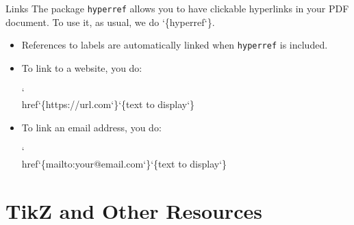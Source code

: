 \documentclass{beamer}
\begin{document}
    \begin{frame}{Links}
        The package \texttt{hyperref} allows you to have clickable hyperlinks in your PDF document. To use it, as usual, we do {\char`\{hyperref\char`\}}.
        \bigskip
        \begin{itemize}
            \item References to labels are automatically linked when \texttt{hyperref} is included.
            \bigskip 
            \item To link to a website, you do:
            \begin{center}
                \ttfamily
                {\color{red!60!black}\char`\\href}\char`\{https://url.com\char`\}\char`\{text to display\char`\}                
            \end{center}
            \bigskip
            \item To link an email address, you do:
            \begin{center}
                \ttfamily
                {\color{red!60!black}\char`\\href}\char`\{mailto:your@email.com\char`\}\char`\{text to display\char`\}                
            \end{center}
        \end{itemize}
    \end{frame}

    \section{TikZ and Other Resources}
\end{document}

